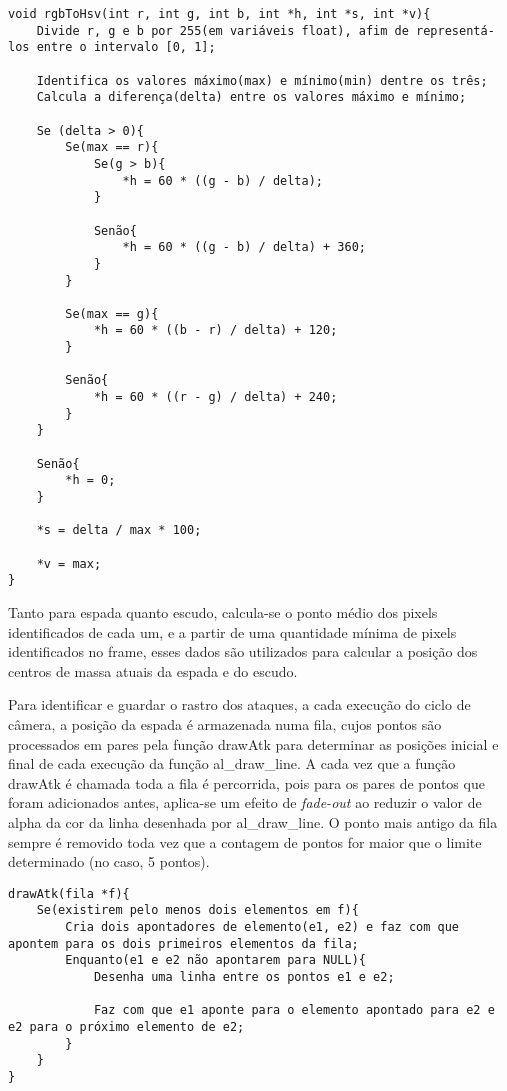 \documentclass[12pt]{article}
\begin{document}
\begin{lstlisting}
void rgbToHsv(int r, int g, int b, int *h, int *s, int *v){
    Divide r, g e b por 255(em variáveis float), afim de representá-los entre o intervalo [0, 1];
    
    Identifica os valores máximo(max) e mínimo(min) dentre os três;
    Calcula a diferença(delta) entre os valores máximo e mínimo;
    
    Se (delta > 0){
        Se(max == r){
            Se(g > b){
                *h = 60 * ((g - b) / delta);
            }
            
            Senão{
                *h = 60 * ((g - b) / delta) + 360;
            }
        }
        
        Se(max == g){
            *h = 60 * ((b - r) / delta) + 120;
        }
        
        Senão{
            *h = 60 * ((r - g) / delta) + 240;
        }
    }
    
    Senão{
        *h = 0;
    }
    
    *s = delta / max * 100;
    
    *v = max;
}
\end{lstlisting}

Tanto para espada quanto escudo, calcula-se o ponto médio dos pixels identificados de cada um, e a partir de uma quantidade mínima de pixels identificados no frame, esses dados são utilizados para calcular a posição dos centros de massa atuais da espada e do escudo.

Para identificar e guardar o rastro dos ataques, a cada execução do ciclo de câmera, a posição da espada é armazenada numa fila, cujos pontos são processados em pares pela função drawAtk para determinar as posições inicial e final de cada execução da função al\_draw\_line. A cada vez que a função drawAtk é chamada toda a fila é percorrida, pois para os pares de pontos que foram adicionados antes, aplica-se um efeito de \textit{fade-out} ao reduzir o valor de alpha da cor da linha desenhada por al\_draw\_line. O ponto mais antigo da fila sempre é removido toda vez que a contagem de pontos for maior que o limite determinado (no caso, 5 pontos).

\begin{lstlisting}
drawAtk(fila *f){
    Se(existirem pelo menos dois elementos em f){
        Cria dois apontadores de elemento(e1, e2) e faz com que apontem para os dois primeiros elementos da fila;
        Enquanto(e1 e e2 não apontarem para NULL){
            Desenha uma linha entre os pontos e1 e e2;
            
            Faz com que e1 aponte para o elemento apontado para e2 e e2 para o próximo elemento de e2;
        }
    }
}
\end{lstlisting}
\end{document}
